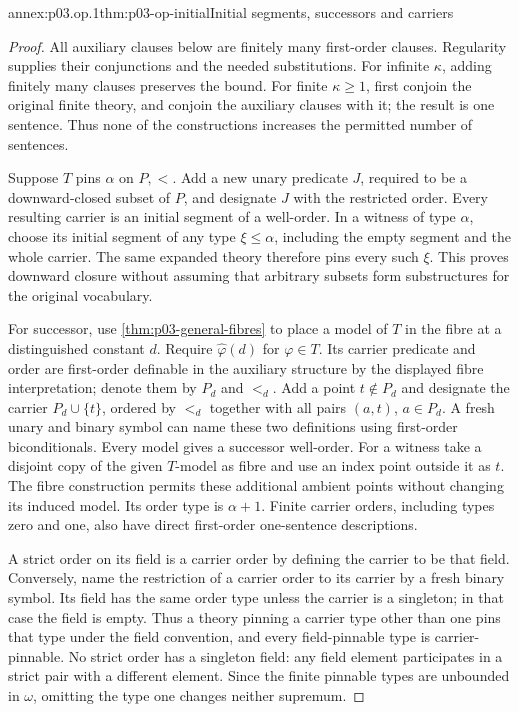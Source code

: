 \begin{annexitem}{annex:p03.op.1}{thm:p03-op-initial}{Initial segments, successors and carriers}
\begin{proof}
All auxiliary clauses below are finitely many first-order clauses.
Regularity supplies their conjunctions and the needed substitutions.
For infinite \(\kappa\), adding finitely many clauses preserves the
bound. For finite \(\kappa\geq1\), first conjoin the original
finite theory, and conjoin the auxiliary clauses with it; the result
is one sentence. Thus none of the constructions increases the
permitted number of sentences.

Suppose \(T\) pins \(\alpha\) on \(P,<\). Add a new unary
predicate \(J\), required to be a downward-closed subset of \(P\),
and designate \(J\) with the restricted order. Every resulting
carrier is an initial segment of a well-order. In a witness of
type \(\alpha\), choose its initial segment of any type
\(\xi\leq\alpha\), including the empty segment and the whole
carrier. The same expanded theory therefore pins every such
\(\xi\). This proves downward closure without assuming that
arbitrary subsets form substructures for the original vocabulary.

For successor, use \cref{thm:p03-general-fibres} to place a model
of \(T\) in the fibre at a distinguished constant \(d\).
Require \(\widehat\varphi(d)\) for \(\varphi\in T\).
Its carrier predicate and order are first-order definable in the
auxiliary structure by the displayed fibre interpretation; denote
them by \(P_d\) and \(<_d\). Add a point \(t\notin P_d\)
and designate the carrier \(P_d\cup\{t\}\), ordered by
\(<_d\) together with all pairs \((a,t)\), \(a\in P_d\).
A fresh unary and binary symbol can name these two definitions
using first-order biconditionals. Every model gives a successor
well-order. For a witness take a disjoint copy of the given
\(T\)-model as fibre and use an index point outside it as \(t\).
The fibre construction permits these additional ambient points
without changing its induced model. Its order type is
\(\alpha+1\). Finite carrier orders, including types zero and
one, also have direct first-order one-sentence descriptions.

A strict order on its field is a carrier order by defining the
carrier to be that field. Conversely, name the restriction of a
carrier order to its carrier by a fresh binary symbol. Its field
has the same order type unless the carrier is a singleton; in
that case the field is empty. Thus a theory pinning a carrier
type other than one pins that type under the field convention,
and every field-pinnable type is carrier-pinnable. No strict
order has a singleton field: any field element participates in
a strict pair with a different element. Since the finite
pinnable types are unbounded in \(\omega\), omitting the type
one changes neither supremum.


\end{proof}
\end{annexitem}
